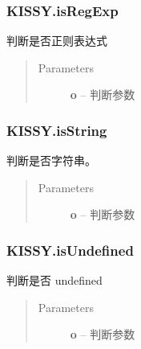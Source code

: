 \documentclass[letterpaper,10pt,english]{sphinxmanual}
\begin{document}
\subsubsection{KISSY.isRegExp}
\label{api/seed/lang/isRegExp:kissy-isregexp}\label{api/seed/lang/isRegExp::doc}

\begin{fulllineitems}
\label{api/seed/lang/isRegExp:Lang.KISSY.isRegExp}
判断是否正则表达式
\begin{quote}\begin{description}
\item[{Parameters}] \leavevmode
\textbf{o} -- 判断参数

\end{description}\end{quote}

\end{fulllineitems}



\subsubsection{KISSY.isString}
\label{api/seed/lang/isString::doc}\label{api/seed/lang/isString:kissy-isstring}

\begin{fulllineitems}
\label{api/seed/lang/isString:Lang.KISSY.isString}
判断是否字符串。
\begin{quote}\begin{description}
\item[{Parameters}] \leavevmode
\textbf{o} -- 判断参数

\end{description}\end{quote}

\end{fulllineitems}



\subsubsection{KISSY.isUndefined}
\label{api/seed/lang/isUndefined::doc}\label{api/seed/lang/isUndefined:kissy-isundefined}

\begin{fulllineitems}
\label{api/seed/lang/isUndefined:Lang.KISSY.isUndefined}
判断是否 undefined
\begin{quote}\begin{description}
\item[{Parameters}] \leavevmode
\textbf{o} -- 判断参数

\end{description}\end{quote}

\end{fulllineitems}
\end{document}

